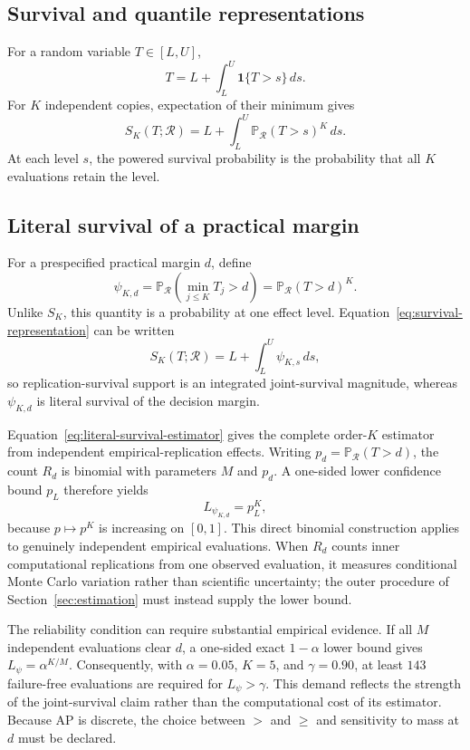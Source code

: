 \documentclass[11pt]{article}
\newcommand{\Regime}{\mathcal{R}}
\newcommand{\Prb}{\mathbb{P}}
\theoremstyle{remark}
\begin{document}
\subsection{Survival and quantile representations}

For a random variable $T\in[L,U]$,
\[
T=L+\int_L^U\mathbf 1\{T>s\}\,ds.
\]
For $K$ independent copies, expectation of their minimum gives
\begin{equation}
S_K(T;\Regime)
=
L+\int_L^U\Prb_{\Regime}(T>s)^K\,ds.
\label{eq:survival-representation}
\end{equation}
At each level $s$, the powered survival probability is the probability that all $K$ evaluations retain the level.

\subsection{Literal survival of a practical margin}
\label{app:literal-survival}

For a prespecified practical margin $d$, define
\begin{equation}
\psi_{K,d}
=
\Prb_{\Regime}\left(\min_{j\leq K}T_j>d\right)
=
\Prb_{\Regime}(T>d)^K.
\label{eq:literal-survival}
\end{equation}
Unlike $S_K$, this quantity is a probability at one effect level. Equation~\eqref{eq:survival-representation} can be written
\[
S_K(T;\Regime)=L+\int_L^U\psi_{K,s}\,ds,
\]
so replication-survival support is an integrated joint-survival magnitude, whereas $\psi_{K,d}$ is literal survival of the decision margin.

Equation~\eqref{eq:literal-survival-estimator} gives the complete order-$K$ estimator from independent empirical-replication effects. Writing $p_d=\Prb_{\Regime}(T>d)$, the count $R_d$ is binomial with parameters $M$ and $p_d$. A one-sided lower confidence bound $p_L$ therefore yields
\begin{equation}
L_{\psi_{K,d}}=p_L^K,
\label{eq:literal-survival-lower-bound}
\end{equation}
because $p\mapsto p^K$ is increasing on $[0,1]$. This direct binomial construction applies to genuinely independent empirical evaluations. When $R_d$ counts inner computational replications from one observed evaluation, it measures conditional Monte Carlo variation rather than scientific uncertainty; the outer procedure of Section~\ref{sec:estimation} must instead supply the lower bound.

The reliability condition can require substantial empirical evidence. If all $M$ independent evaluations clear $d$, a one-sided exact $1-\alpha$ lower bound gives $L_{\psi}=\alpha^{K/M}$. Consequently, with $\alpha=0.05$, $K=5$, and $\gamma=0.90$, at least $143$ failure-free evaluations are required for $L_{\psi}>\gamma$. This demand reflects the strength of the joint-survival claim rather than the computational cost of its estimator. Because AP is discrete, the choice between $>$ and $\geq$ and sensitivity to mass at $d$ must be declared.
\end{document}
